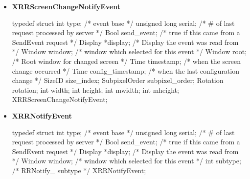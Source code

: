 \documentclass{report}
\begin{document}
\begin{itemize}
\begin{cppcode}
                    \end{cppcode}
                    \bigbreak \noindent 
                    Updates Xlib's internal understanding of the X screen configuration based on this RandR screen-change event. It is intended for an 
                    \bigbreak \noindent 
                    \begin{cppcode}
                    RRScreenChangeNotify
                    \end{cppcode}
                \item \textbf{XRRScreenChangeNotifyEvent}
                    \bigbreak \noindent 
                    \begin{cppcode}
                        typedef struct {
                            int type;			/* event base */
                            unsigned long serial;	/* # of last request processed by server */
                            Bool send_event;		/* true if this came from a SendEvent request */
                            Display *display;		/* Display the event was read from */
                            Window window;		/* window which selected for this event */
                            Window root;		/* Root window for changed screen */
                            Time timestamp;		/* when the screen change occurred */
                            Time config_timestamp;	/* when the last configuration change */
                            SizeID size_index;
                            SubpixelOrder subpixel_order;
                            Rotation rotation;
                            int width;
                            int height;
                            int mwidth;
                            int mheight;
                        } XRRScreenChangeNotifyEvent;
                    \end{cppcode}
                \item \textbf{XRRNotifyEvent}
                    \bigbreak \noindent 
                    \begin{cppcode}
                        typedef struct {
                            int type;			/* event base */
                            unsigned long serial;	/* # of last request processed by server */
                            Bool send_event;		/* true if this came from a SendEvent request */
                            Display *display;		/* Display the event was read from */
                            Window window;		/* window which selected for this event */
                            int subtype;		/* RRNotify_ subtype */
                        } XRRNotifyEvent;

\end{cppcode}
\end{itemize}
\end{document}

